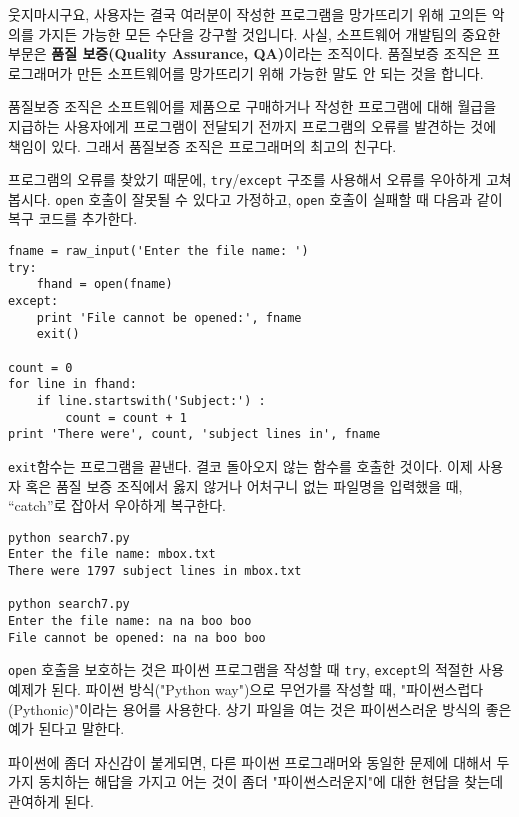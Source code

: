웃지마시구요, 사용자는 결국 여러분이 작성한 프로그램을 망가뜨리기 위해 고의든 악의를 가지든 가능한 모든 수단을 강구할 것입니다.
사실, 소프트웨어 개발팀의 중요한 부문은 {\bf 품질 보증(Quality Assurance, QA)}이라는 조직이다. 
품질보증 조직은 프로그래머가 만든 소프트웨어를 망가뜨리기 위해 가능한 말도 안 되는 것을 합니다.


품질보증 조직은 소프트웨어를 제품으로 구매하거나 작성한 프로그램에 대해 월급을 지급하는 사용자에게 프로그램이 전달되기 전까지 프로그램의 오류를 발견하는 것에 책임이 있다.
그래서 품질보증 조직은 프로그래머의 최고의 친구다.


프로그램의 오류를 찾았기 때문에, {\tt try}/{\tt except} 구조를 사용해서 오류를 우아하게 고쳐봅시다.
{\tt open} 호출이 잘못될 수 있다고 가정하고, {\tt open} 호출이 실패할 때 다음과 같이 복구 코드를 추가한다.

\beforeverb
\begin{verbatim}
fname = raw_input('Enter the file name: ')
try:
    fhand = open(fname)
except:
    print 'File cannot be opened:', fname
    exit()

count = 0
for line in fhand:
    if line.startswith('Subject:') : 
        count = count + 1
print 'There were', count, 'subject lines in', fname
\end{verbatim}
\afterverb
%

{\tt exit}함수는 프로그램을 끝낸다. 결코 돌아오지 않는 함수를 호출한 것이다.
이제 사용자 혹은 품질 보증 조직에서 옳지 않거나 어처구니 없는 파일명을 입력했을 때, 
``catch''로 잡아서 우아하게 복구한다.

\beforeverb
\begin{verbatim}
python search7.py
Enter the file name: mbox.txt
There were 1797 subject lines in mbox.txt

python search7.py
Enter the file name: na na boo boo
File cannot be opened: na na boo boo
\end{verbatim}
\afterverb
%

{\tt open} 호출을 보호하는 것은 파이썬 프로그램을 작성할 때 {\tt try}, {\tt except}의 적절한 사용 예제가 된다.
파이썬 방식("Python way")으로 무언가를 작성할 때, "파이썬스럽다(Pythonic)"이라는 용어를 사용한다.
상기 파일을 여는 것은 파이썬스러운 방식의 좋은 예가 된다고 말한다.

파이썬에 좀더 자신감이 붙게되면, 다른 파이썬 프로그래머와 동일한 문제에 대해서 
두 가지 동치하는 해답을 가지고 어는 것이 좀더 "파이썬스러운지"에 대한 현답을 찾는데 관여하게 된다.

